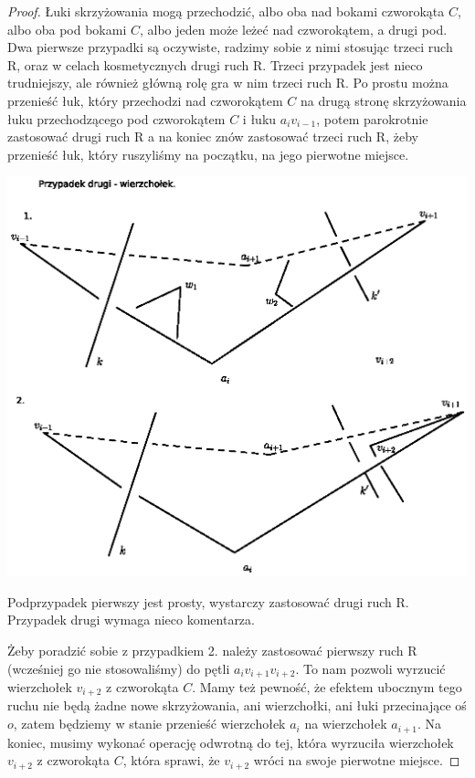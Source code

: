 \begin{proof}
Łuki skrzyżowania mogą przechodzić, albo oba nad bokami czworokąta $C$, albo oba pod bokami $C$, albo jeden może leżeć nad czworokątem, a drugi pod. Dwa pierwsze przypadki są oczywiste,
radzimy sobie z nimi stosując trzeci ruch R, oraz w celach kosmetycznych drugi ruch R. Trzeci przypadek jest nieco trudniejszy, ale również główną rolę gra w nim trzeci ruch R. Po
prostu można przenieść łuk, który przechodzi nad czworokątem $C$ na drugą stronę skrzyżowania łuku przechodzącego pod czworokątem $C$ i łuku $a_i v_{i-1}$, potem parokrotnie zastosować
drugi ruch R a na koniec znów zastosować trzeci ruch R, żeby przenieść łuk, który ruszyliśmy na początku, na jego pierwotne miejsce.

\begin{minipage}{0.3\textwidth}
	\begin{center}

	\includegraphics[scale=0.8]{1/pictures/vertex.eps}
	\end{center}
	\end{minipage}
	
Podprzypadek pierwszy jest prosty, wystarczy zastosować drugi ruch R. Przypadek drugi wymaga nieco komentarza. 

Żeby poradzić sobie z przypadkiem 2. należy zastosować pierwszy ruch R (wcześniej go nie stosowaliśmy) do pętli $a_iv_{i+1}v_{i+2}$. To nam pozwoli wyrzucić wierzchołek $v_{i+2}$ z 
czworokąta $C$. Mamy też pewność, że efektem ubocznym tego ruchu nie będą żadne nowe skrzyżowania, ani wierzchołki, ani łuki przecinające oś $o$, zatem będziemy w stanie przenieść 
wierzchołek $a_i$ na wierzchołek $a_{i+1}$. Na koniec, musimy wykonać operację odwrotną do tej, która wyrzuciła wierzchołek $v_{i+2}$ z czworokąta $C$, która sprawi, że $v_{i+2}$
wróci na swoje pierwotne miejsce.


\end{proof}
